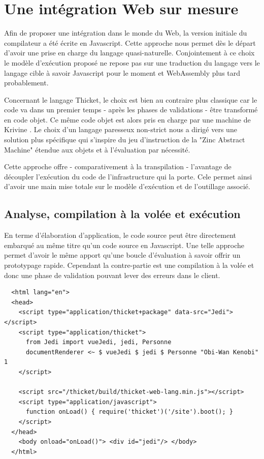 \documentclass[twoside,a4paper]{article}
\begin{document}
\section{Une intégration Web sur mesure}

Afin de  proposer une  intégration dans  le monde  du Web,  la version
initiale du  compilateur a été  écrite en Javascript.   Cette approche
nous  permet dès  le départ  d'avoir une  prise en  charge du  langage
quasi-naturelle.   Conjointement  à  ce choix  le  modèle  d'exécution
proposé ne  repose pas sur une  traduction du langage vers  le langage
cible   à   savoir   Javascript   pour  le   moment   et   WebAssembly
\cite{rossberg2016webassembly} plus tard probablement.

Concernant le  langage Thicket,  le choix est  bien au  contraire plus
classique car le code  va dans un premier temps -  après les phases de
validations -  être transformé en code  objet. Ce même code  objet est
alors pris en  charge par une machine  de Krivine \cite{krivine:2007}.
Le  choix d'un  langage paresseux  non-strict nous  a dirigé  vers une
solution  plus spécifique  qui s'inspire  du jeu  d'instruction de  la
"Zinc  Abstract   Machine"  \cite{zinc}   étendue  aux  objets   et  à
l'évaluation par nécessité.

Cette approche offre - comparativement à la transpilation - l'avantage
de  découpler   l'exécution  du   code  de  l'infrastructure   qui  la
porte. Cele  permet ainsi d'avoir une  main mise totale sur  le modèle
d'exécution et de l'outillage associé.

\subsection{Analyse, compilation à la volée et exécution}

En  terme  d'élaboration  d'application,  le  code  source  peut  être
directement   embarqué   au   même   titre  qu'un   code   source   en
Javascript. Une  telle approche permet  d'avoir le même  apport qu'une
boucle d'évaluation  à savoir offrir un  prototypage rapide. Cependant
la contre-partie est  une compilation à la volée et  donc une phase de
validation pouvant lever des erreurs dans le client.

\lstset{language=Html}
\begin{lstlisting}
  <html lang="en">
  <head>
    <script type="application/thicket+package" data-src="Jedi"></script>
    <script type="application/thicket">
      from Jedi import vueJedi, jedi, Personne
      documentRenderer <~ $ vueJedi $ jedi $ Personne "Obi-Wan Kenobi" 1
    </script>

    <script src="/thicket/build/thicket-web-lang.min.js"></script>    
    <script type="application/javascript">
      function onLoad() { require('thicket')('/site').boot(); }
    </script>
  </head>        
    <body onload="onLoad()"> <div id="jedi"/> </body>
  </html>
\end{lstlisting}
\end{document}
